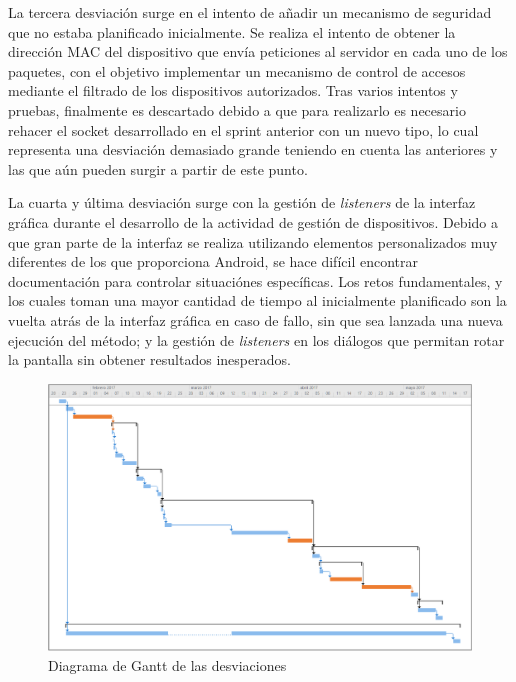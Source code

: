 \documentclass[12pt]{article}
\begin{document}
        La tercera desviación surge en el intento de añadir un mecanismo de seguridad que no estaba planificado inicialmente. Se realiza el intento de obtener la dirección MAC del dispositivo que envía peticiones al servidor en cada uno de los paquetes, con el objetivo implementar un mecanismo de control de accesos mediante el filtrado de los dispositivos autorizados. Tras varios intentos y pruebas, finalmente es descartado debido a que para realizarlo es necesario rehacer el socket desarrollado en el sprint anterior con un nuevo tipo, lo cual representa una desviación demasiado grande teniendo en cuenta las anteriores y las que aún pueden surgir a partir de este punto.

        La cuarta y última desviación surge con la gestión de \textit{listeners} de la interfaz gráfica durante el desarrollo de la actividad de gestión de dispositivos. Debido a que gran parte de la interfaz se realiza utilizando elementos personalizados muy diferentes de los que proporciona Android, se hace difícil encontrar documentación para controlar situaciónes específicas. Los retos fundamentales, y los cuales toman una mayor cantidad de tiempo al inicialmente planificado son la vuelta atrás de la interfaz gráfica en caso de fallo, sin que sea lanzada una nueva ejecución del método; y la gestión de \textit{listeners} en los diálogos que permitan rotar la pantalla sin obtener resultados inesperados.
        
        \begin{figure}[h!]
            \centering
                \includegraphics[scale=0.7]{deviations_gantt.eps}
                \caption{Diagrama de Gantt de las desviaciones}
                \label{fig:deviations_gantt}
        \end{figure}
\end{document}
